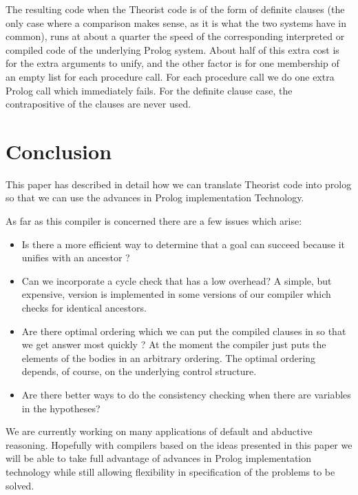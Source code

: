 The resulting code when the Theorist code is of the form of definite clauses 
(the only case where a comparison makes sense,
as it is what the two systems have in common), runs at about a quarter
the speed
of the corresponding interpreted or compiled code of the underlying
Prolog system. About half of this extra cost is
for the extra arguments to unify,
and the other factor is for one membership
of an empty list for each procedure call.
For each procedure call we do one extra Prolog call which immediately fails.
For the definite clause case, the contrapositive of the clauses are never used.
\section{Conclusion}
This paper has described in detail how we can translate Theorist code into
prolog so that we can use the advances in Prolog implementation Technology.

As far as this compiler is concerned there are a few issues which
arise:
\begin{itemize}
\item Is there a more efficient way to determine that a goal can succeed because
it unifies with an ancestor \cite{poole:grace,loveland87}?
\item Can we incorporate a cycle check that has a low overhead?
A simple, but expensive, version is implemented in some versions of
our compiler which checks for identical ancestors.
\item Are there optimal ordering which we can put the compiled
clauses in so that we get answer most quickly \cite{smith86}?
At the moment the compiler just puts the elements of the bodies
in an arbitrary ordering. The optimal ordering depends, of course,
on the underlying control structure.
\item Are there better ways to do the consistency checking when there are
variables in the hypotheses?
\end{itemize}


We are currently working on many applications of default and abductive
reasoning.
Hopefully with compilers based on the ideas presented in this paper
we will be able to take full advantage of
advances in Prolog implementation technology while still allowing
flexibility in specification of the problems to be solved.
